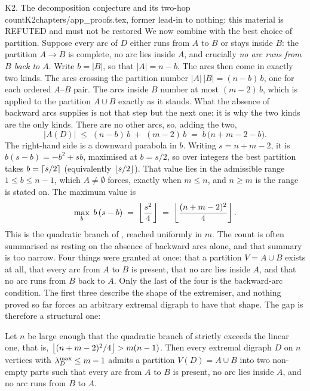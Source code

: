 \begin{offcut}{K2. The decomposition conjecture and its two-hop count}{K2}{chapters/app\_proofs.tex, former lead-in to }{nothing: this material is REFUTED and must not be restored}
We now combine  with the best choice of partition. Suppose every arc of $D$ either runs from $A$ to $B$ or stays inside $B$: the partition $A \to B$ is complete, no arc lies inside $A$, and crucially \emph{no arc runs from $B$ back to $A$}. Write $b = |B|$, so that $|A| = n - b$. The arcs then come in exactly two kinds. The arcs crossing the partition number $|A|\,|B| = (n-b)\,b$, one for each ordered $A$--$B$ pair. The arcs inside $B$ number at most $(m-2)\,b$, which is  applied to the partition $A \cup B$ exactly as it stands. What the absence of backward arcs supplies is not that step but the next one: it is why the two kinds are the only kinds. There are no other arcs, so, adding the two,
\[
   |A(D)| \;\le\; (n-b)\,b \;+\; (m-2)\,b \;=\; b\,\bigl(n + m - 2 - b\bigr).
\]
The right-hand side is a downward parabola in $b$. Writing $s = n + m - 2$, it is $b(s-b) = -b^2 + sb$, maximised at $b = s/2$, so over integers the best partition takes $b = \left\lceil s/2 \right\rceil$ (equivalently $\left\lfloor s/2 \right\rfloor$). That value lies in the admissible range $1 \le b \le n-1$, which $A \ne \emptyset$ forces, exactly when $m \le n$, and $n \ge m$ is the range  is stated on. The maximum value is
\[
   \max_{b} \; b\,(s-b) \;=\; \left\lfloor \frac{s^2}{4} \right\rfloor \;=\; \left\lfloor \frac{(n+m-2)^2}{4} \right\rfloor.
\]
This is the quadratic branch of , reached uniformly in $m$. The count is often summarised as resting on the absence of backward arcs alone, and that summary is too narrow. Four things were granted at once: that a partition $V = A \cup B$ exists at all, that every arc from $A$ to $B$ is present, that no arc lies inside $A$, and that no arc runs from $B$ back to $A$. Only the last of the four is the backward-arc condition. The first three describe the shape of the extremiser, and nothing proved so far forces an arbitrary extremal digraph to have that shape. The gap is therefore a structural one:

\begin{conjecture}\label{open:decomposition}
Let $n$ be large enough that the quadratic branch of  strictly exceeds the linear one, that is, $\left\lfloor (n+m-2)^2/4 \right\rfloor > m(n-1)$. Then every extremal digraph $D$ on $n$ vertices with $\lambda^{\max}_D \le m-1$ admits a partition $V(D) = A \cup B$ into two non-empty parts such that every arc from $A$ to $B$ is present, no arc lies inside $A$, and no arc runs from $B$ to $A$.
\end{conjecture}


\end{offcut}
